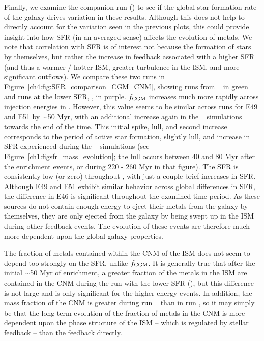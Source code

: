 Finally, we examine the companion run (\runtwonu) to see if the global star formation rate of the galaxy drives variation in these results. Although this does not help to directly account for the variation seen in the previous plots, this could provide insight into how SFR (in an averaged sense) affects the evolution of metals. We note that correlation with SFR is of interest not because the formation of stars by themselves, but rather the increase in feedback associated with a higher SFR (and thus a warmer / hotter ISM, greater turbulence in the ISM, and more significant outflows). We compare these two runs in Figure~\ref{ch4:fig:SFR_comparison_CGM_CNM}, showing runs from \runonenu~ in green and runs at the lower SFR, \runtwonu, in purple. $f_{\rm CGM}$ increases much more rapidly across injection energies in \runonenu. However, this value seems to be similar across runs for E49 and E51 by $\sim$50 Myr, with an additional increase again in the \runonenu~ simulations towards the end of the time. This initial spike, lull, and second increase corresponds to the period of active star formation, slightly lull, and increase in SFR experienced during the \runonenu~ simulations (see Figure~\ref{ch1:figsfr_mass_evolution}; the lull occurs between 40 and 80 Myr after the enrichment events, or during 220 - 260 Myr in that figure). The SFR is consistently low (or zero) throughout \runtwonu, with just a couple brief increases in SFR. Although E49 and E51 exhibit similar behavior across global differences in SFR, the difference in E46 is significant throughout the examined time period. As these sources do not contain enough energy to eject their metals from the galaxy by themselves, they are only ejected from the galaxy by being swept up in the ISM during other feedback events. The evolution of these events are therefore much more dependent upon the global galaxy properties.

The fraction of metals contained within the CNM of the ISM does not seem to depend too strongly on the SFR, unlike $f_{\rm CGM}$. It is generally true that after the initial $\sim$50 Myr of enrichment, a greater fraction of the metals in the ISM are contained in the CNM during the run with the lower SFR (\runtwonu), but this difference is not large and is only significant for the higher energy events. In addition, the mass fraction of the CNM is greater during run \runtwonu~ than in run \runonenu, so it may simply be that the long-term evolution of the fraction of metals in the CNM is more dependent upon the phase structure of the ISM -- which is regulated by stellar feedback -- than the feedback directly.

